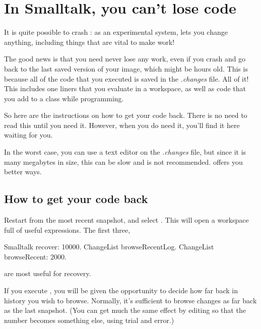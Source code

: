 \documentclass[a4paper,10pt,twoside]{book}
\begin{document}
\section{In Smalltalk, you can't lose code}
\label{sec:cantLoseCode} %

It is quite possible to crash \sq: as an experimental system, \sq lets you change anything, including things that are vital to make \sq work! 


The good news is that you need never lose any work, even if you crash and go back to the last saved version of your image, which might be hours old.
This is because all of the code that you executed is saved in the \emph{.changes} file.
All of it!
This includes one liners that you evaluate in a workspace, as well as code that you add to a class while programming.

So here are the instructions on how to get your code back.
There is no need to read this until you need it. 
However, when you do need it, you'll find it here waiting for you.

In the worst case, you can use a text editor on the \emph{.changes} file, but since it is many megabytes in size, this can be slow and is not recommended. 
\sq offers you better ways.

\subsection{How to get your code back}
Restart \sq from the most recent snapshot, and select . 
This will open a workspace full of useful expressions. The first three,

\begin{code}{}
Smalltalk recover: 10000.
ChangeList browseRecentLog.
ChangeList browseRecent: 2000.
\end{code}

\noindent
are most useful for recovery.

If you execute , you will be given the opportunity to decide how far back in history you wish to browse. 
Normally, it's sufficient to browse changes as far back as the last snapshot. (You can get much the same effect by editing  so that the number  becomes something else, using trial and error.)
\end{document}
